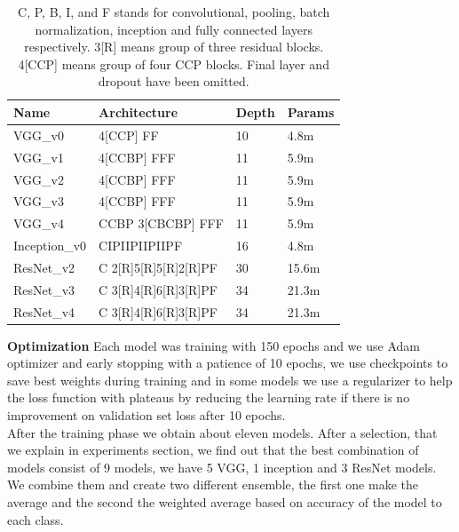 \documentclass[10pt,twocolumn,letterpaper]{article}
\begin{document}
\begin{table}[H]
   \begin{tabular}{L{1.2cm}R{3.5cm}C{0.6cm}C{1.4cm}}
      \hline
      Name          & Architecture         & Depth & Params \\ %
      \hline\hline
      VGG\_v0       & 4[CCP] FF            & 10    & 4.8m   \\%
      VGG\_v1       & 4[CCBP] FFF          & 11    & 5.9m   \\ %
      VGG\_v2       & 4[CCBP] FFF          & 11    & 5.9m   \\%
      VGG\_v3       & 4[CCBP] FFF          & 11    & 5.9m   \\%
      VGG\_v4       & CCBP 3[CBCBP] FFF    & 11    & 5.9m   \\%
      Inception\_v0 & CIPIIPIIPIIPF        & 16    & 4.8m   \\%
      ResNet\_v2    & C 2[R]5[R]5[R]2[R]PF & 30    & 15.6m  \\%
      ResNet\_v3    & C 3[R]4[R]6[R]3[R]PF & 34    & 21.3m  \\%
      ResNet\_v4    & C 3[R]4[R]6[R]3[R]PF & 34    & 21.3m  \\%
      \hline
   \end{tabular}
   \caption{C, P, B, I, and F stands for convolutional, pooling, batch normalization,
      inception and fully connected layers respectively. 3[R] means group of three residual blocks.
      4[CCP] means group of four CCP blocks.
      Final layer and dropout have been omitted.}
   \label{mytable}
\end{table}

{\bf Optimization}
Each model was training with 150 epochs and we use Adam optimizer and early stopping with a patience of 10 epochs, we use checkpoints to save best weights during training and in some models we use a regularizer to help the loss function with plateaus by reducing the learning rate if there is no improvement on validation set loss after 10 epochs. 
\\After the training phase we obtain about eleven models. After a selection, that we explain in experiments section, we find out that the best combination of models consist of 9 models, we have 5 VGG, 1 inception and 3 ResNet models. We combine them and create two different ensemble, the first one make the average and the second the weighted average based on accuracy of the model to each class.
\end{document}
